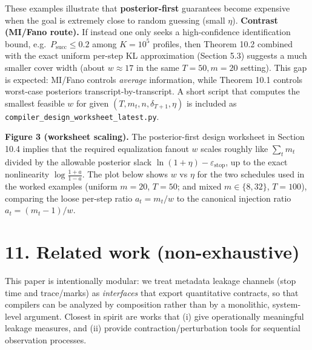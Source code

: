 \documentclass[11pt]{article}
\begin{document}
These examples illustrate that \textbf{posterior-first} guarantees
become expensive when the goal is extremely close to random guessing
(small \(\eta\)). \textbf{Contrast (MI/Fano route).} If instead one only
seeks a high-confidence identification bound,
e.g.~\(P_{\mathrm{succ}}\le 0.2\) among \(K=10^5\) profiles, then
Theorem 10.2 combined with the exact uniform per-step KL approximation
(Section 5.3) suggests a much smaller cover width (about \(w\approx 17\)
in the same \(T=50,m=20\) setting). This gap is expected: MI/Fano
controls \emph{average} information, while Theorem 10.1 controls
worst-case posteriors transcript-by-transcript. A short script that
computes the smallest feasible \(w\) for given
\((T,m_t,n,\delta_{T+1},\eta)\) is included as
\texttt{compiler\_design\_worksheet\_latest.py}.

\textbf{Figure 3 (worksheet scaling).} The posterior-first design
worksheet in Section 10.4 implies that the required equalization fanout
\(w\) scales roughly like \(\sum_t m_t\) divided by the allowable
posterior slack \(\ln(1+\eta)-\varepsilon_{\mathrm{stop}}\), up to the
exact nonlinearity \(\log\frac{1+a}{1-a}\). The plot below shows \(w\)
vs \(\eta\) for the two schedules used in the worked examples (uniform
\(m=20\), \(T=50\); and mixed \(m\in\{8,32\}\), \(T=100\)), comparing
the loose per-step ratio \(a_t=m_t/w\) to the canonical injection ratio
\(a_t=(m_t-1)/w\).

\begin{center}
\end{center}

\hypertarget{related-work-non-exhaustive}{%
\section{11. Related work
(non-exhaustive)}\label{related-work-non-exhaustive}}

This paper is intentionally modular: we treat metadata leakage channels
(stop time and trace/marks) as \emph{interfaces} that export
quantitative contracts, so that compilers can be analyzed by composition
rather than by a monolithic, system-level argument. Closest in spirit
are works that (i) give operationally meaningful leakage measures, and
(ii) provide contraction/perturbation tools for sequential observation
processes.
\end{document}
